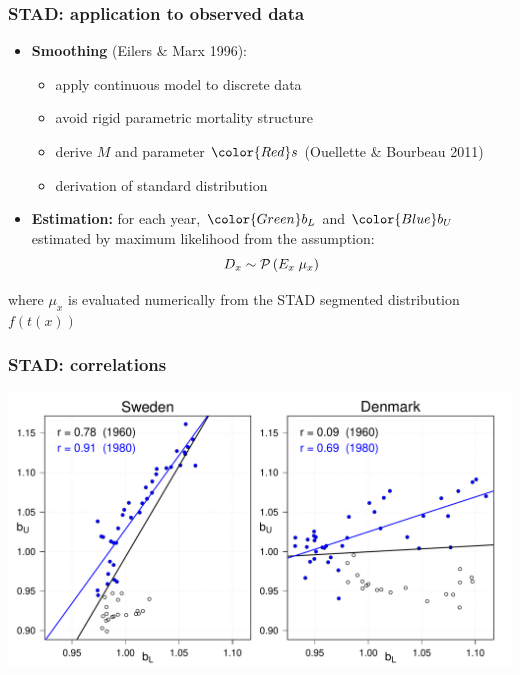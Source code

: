 \documentclass[12pt, xcolor=table]{beamer}  %
\begin{document}
\begin{frame}[noframenumbering]\frametitle{STAD: application to observed data}
	\vspace{0.4cm}
	\begin{itemize}
		
		\item \textbf{Smoothing} {\scriptsize (Eilers \& Marx 1996)}:
		\begin{itemize}
			\item apply continuous model to discrete data		
			\item avoid rigid parametric mortality structure
			\item derive $M$ and parameter ${\color{Red}s}$ {\scriptsize (Ouellette \& Bourbeau 2011)}
			\item derivation of standard distribution 
		\end{itemize}
		\bigskip
		
		\item \textbf{Estimation:} for each year, ${\color{Green} b_{L}}$ and ${\color{Blue} b_{U}}$ estimated by maximum likelihood from the assumption: 
		\begin{equation}\label{Eq:Poisson}
		D_{x} \sim \mathcal{P} \, (E_{x} \; \mu_{x}) \notag 
		\end{equation}
	\end{itemize}	
	
	\vspace{0.05cm}
	\begin{center}
		{\scriptsize where $\mu_{x}$ is evaluated numerically from the STAD segmented distribution $f(t(x))$}
		
	\end{center}		
		
\end{frame}

\begin{frame}[noframenumbering]\frametitle{STAD: correlations}

\vspace{-0.5cm}
	
	\begin{center}	
		\vspace{0.2cm}
		
		\includegraphics[scale=.42]{Figures/Ch2/F_CORR_B}
		
	\end{center}
	
\end{frame}
\end{document}
